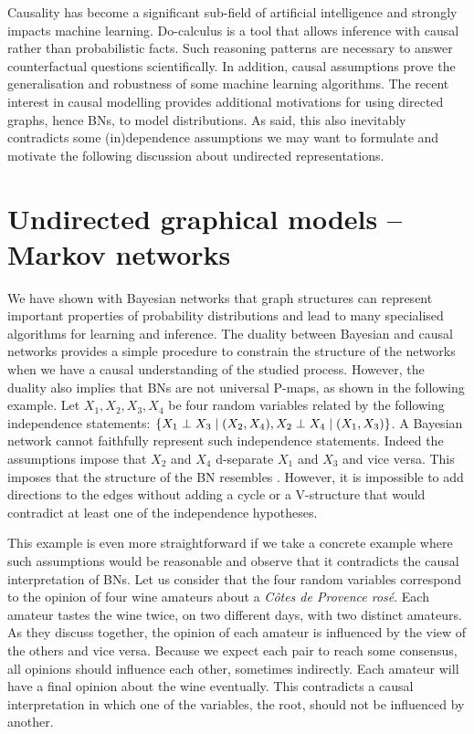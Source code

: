 Causality has become a significant sub-field of artificial intelligence and strongly impacts machine learning. Do-calculus \citep{pearl1994probabilistic} is a tool that allows inference with causal rather than probabilistic facts. Such reasoning patterns are necessary to answer counterfactual questions scientifically. In addition, causal assumptions prove the generalisation and robustness of some machine learning algorithms. The recent interest in causal modelling provides additional motivations for using directed graphs, hence BNs, to model distributions. As said, this also inevitably contradicts some (in)dependence assumptions we may want to formulate and motivate the following discussion about undirected representations.
\section{Undirected graphical models -- Markov networks}
We have shown with Bayesian networks that graph structures can represent important properties of probability distributions and lead to many specialised algorithms for learning and inference. The duality between Bayesian and causal networks provides a simple procedure to constrain the structure of the networks when we have a causal understanding of the studied process. However, the duality also implies that BNs are not universal P-maps, as shown in the following example. Let $X_1, X_2, X_3, X_4$ be four random variables related by the following independence statements: $\{ X_1 \perp X_3 \mid (X_2, X_4), X_2 \perp X_4 \mid (X_1, X_3)\}$. A Bayesian network cannot faithfully represent such independence statements. Indeed the assumptions impose that $X_2$ and $X_4$ d-separate $X_1$ and $X_3$ and vice versa. This imposes that the structure of the BN resembles . However, it is impossible to add directions to the edges without adding a cycle or a V-structure that would contradict at least one of the independence hypotheses.

This example is even more straightforward if we take a concrete example where such assumptions would be reasonable and observe that it contradicts the causal interpretation of BNs. Let us consider that the four random variables correspond to the opinion of four wine amateurs about a \textit{C{\^o}tes de Provence ros{\'e}}. Each amateur tastes the wine twice, on two different days, with two distinct amateurs. As they discuss together, the opinion of each amateur is influenced by the view of the others and vice versa. Because we expect each pair to reach some consensus, all opinions should influence each other, sometimes indirectly.  Each amateur will have a final opinion about the wine eventually. This contradicts a causal interpretation in which one of the variables, the root, should not be influenced by another.

